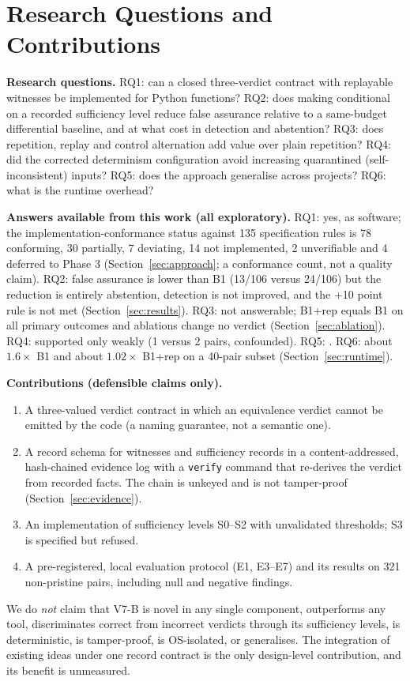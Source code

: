 \section{Research Questions and Contributions}\label{sec:rqs}
\textbf{Research questions.} RQ1: can a closed three-verdict contract with replayable witnesses be implemented for Python functions? RQ2: does making \NDO{} conditional on a recorded sufficiency level reduce false assurance relative to a same-budget differential baseline, and at what cost in detection and abstention? RQ3: does repetition, replay and control alternation add value over plain repetition? RQ4: did the corrected determinism configuration avoid increasing quarantined (self-inconsistent) inputs? RQ5: does the approach generalise across projects? RQ6: what is the runtime overhead?

\textbf{Answers available from this work (all exploratory).} RQ1: yes, as software; the implementation-conformance status against 135 specification rules is 78 conforming, 30 partially, 7 deviating, 14 not implemented, 2 unverifiable and 4 deferred to Phase 3 (Section~\ref{sec:approach}; a conformance count, not a quality claim). RQ2: false assurance is lower than B1 (13/106 versus 24/106) but the reduction is entirely abstention, detection is not improved, and the +10 point rule is not met (Section~\ref{sec:results}). RQ3: not answerable; B1+rep equals B1 on all primary outcomes and ablations change no verdict (Section~\ref{sec:ablation}). RQ4: supported only weakly (1 versus 2 pairs, confounded). RQ5: \NE{}. RQ6: about $1.6\times$ B1 and about $1.02\times$ B1+rep on a 40-pair subset (Section~\ref{sec:runtime}).

\textbf{Contributions (defensible claims only).}
\begin{enumerate}
\item A three-valued verdict contract in which an equivalence verdict cannot be emitted by the code (a naming guarantee, not a semantic one).
\item A record schema for witnesses and sufficiency records in a content-addressed, hash-chained evidence log with a \texttt{verify} command that re-derives the verdict from recorded facts. The chain is unkeyed and is not tamper-proof (Section~\ref{sec:evidence}).
\item An implementation of sufficiency levels S0--S2 with unvalidated thresholds; S3 is specified but refused.
\item A pre-registered, local evaluation protocol (E1, E3--E7) and its results on 321 non-pristine pairs, including null and negative findings.
\end{enumerate}
We do \emph{not} claim that V7-B is novel in any single component, outperforms any tool, discriminates correct from incorrect verdicts through its sufficiency levels, is deterministic, is tamper-proof, is OS-isolated, or generalises. The integration of existing ideas under one record contract is the only design-level contribution, and its benefit is unmeasured.

